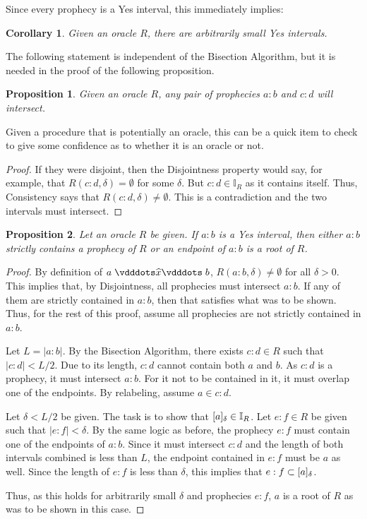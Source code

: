 \documentclass[12pt]{article}
\newtheorem{corollary}{Corollary}[section]
\newtheorem{proposition}{Proposition}[section]
\begin{document}
Since every prophecy is a Yes interval, this immediately implies:
\begin{corollary}
    Given an oracle $R$, there are arbitrarily small Yes intervals. 
\end{corollary}

The following statement is independent of the Bisection Algorithm, but it is needed in the proof of the following proposition. 

\begin{proposition}\label{os:prointer}
    Given an oracle $R$, any pair of prophecies $a:b$ and $c:d$ will intersect. 
\end{proposition}

Given a procedure that is potentially an oracle, this can be a quick item to check to give some confidence as to whether it is an oracle or not. 

\begin{proof}
    If they were disjoint, then the Disjointness property would say, for example, that $R(c:d, \delta)= \emptyset$ for some $\delta$. But $c:d \in \mathbb{I}_R$ as it contains itself. Thus, Consistency says that $R(c:d, \delta) \neq \emptyset$. This is a contradiction and the two intervals must intersect. 
\end{proof}

\begin{proposition}\label{os:yescat}
    Let an oracle $R$ be given. If $a:b$ is a Yes interval, then either $a:b$ strictly contains a prophecy of $R$ or an endpoint of $a:b$ is a root of $R$. 
\end{proposition}

\begin{proof}
    By definition of $a \xora b$, $R(a:b, \delta) \neq \emptyset$ for all $\delta > 0$. This implies that, by Disjointness, all prophecies must intersect $a:b$. If any of them are strictly contained in $a:b$, then that satisfies what was to be shown. Thus, for the rest of this proof, assume all prophecies are not strictly contained in $a:b$.

    Let $L = |a:b|$. By the Bisection Algorithm, there exists $c:d \in R$ such that $|c:d| < L/2$. Due to its length, $c:d$ cannot contain both $a$ and $b$. As $c:d$ is a prophecy, it must intersect $a:b$. For it not to be contained in it, it must overlap one of the endpoints. By relabeling, assume $a \in c:d$.
    
    Let $\delta < L/2$ be given. The task is to show that $[a]_{\delta} \in \mathbb{I}_R$. Let $e:f \in R$ be given such that $|e:f| < \delta$. By the same logic as before, the prophecy $e:f$ must contain one of the endpoints of $a:b$. Since it must intersect $c:d$ and the length of both intervals combined is less than $L$, the endpoint contained in $e:f$ must be $a$ as well. Since the length of $e:f$ is less than $\delta$, this implies that $e:f \subset [a]_{\delta}$.

    Thus, as this holds for arbitrarily small $\delta$ and prophecies $e:f$, $a$ is a root of $R$ as was to be shown in this case. 
\end{proof}
\end{document}
